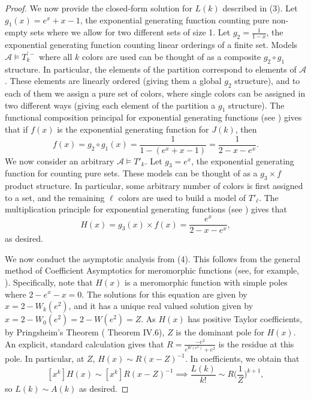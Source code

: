 \documentclass[11pt]{amsart}
\theoremstyle{definition}
\def\A{\mathcal A}
\begin{document}
\begin{proof}
    We now provide the closed-form solution for $L(k)$ described in (3).
    Let $g_1(x)=e^{x}+x-1$, the exponential generating function counting pure non-empty sets where we allow for two different sets of size 1.
    Let $g_2=\frac1{1-x}$, the exponential generating function counting linear orderings of a finite set.
    Models $\A\models T^{'-}_k$ where all $k$ colors are used can be thought of as a composite $g_2\circ g_1$ structure.
    In particular, the elements of the partition correspond to elements of $\A$.
    These elements are linearly ordered (giving them a global $g_2$ structure), and to each of them we assign a pure set of colors, where single colors can be assigned in two different ways (giving each element of the partition a $g_1$ structure).
    The functional composition principal for exponential generating functions (see \cite[Chapter 2]{AnCom}) gives that if $f(x)$ is the exponential generating function for $J(k)$, then
    \[f(x)= g_2\circ g_1(x)=\frac{1}{1-(e^{x}+x-1)}=\frac{1}{2-x-e^x}. \]
    We now consider an arbitrary $\A\models T'_k$.
    Let $g_3=e^x$, the exponential generating function for counting pure sets.
    These models can be thought of as a $g_3\times f$ product structure.
    In particular, some arbitrary number of colors is first assigned to a set, and the remaining $\ell$ colors are used to build a model of $T'_\ell$.
    The multiplication principle for exponential generating functions (see \cite[Chapter 2]{AnCom}) gives that
    \[H(x)=g_3(x)\times f(x)=\frac{e^x}{2-x-e^x},\]
    as desired.

    We now conduct the asymptotic analysis from (4).
    This follows from the general method of Coefficient Asymptotics for meromorphic functions (see, for example, \cite[Chapter VI.5.2]{AnCom}).
    Specifically, note that $H(x)$ is a meromorphic function with simple poles where $2-e^x-x=0$.
    The solutions for this equation are given by $x=2-W_k(e^2)$, and it has a unique real valued solution given by $x=2-W_0(e^2)= 2-W(e^2)=Z$.
    As $H(x)$ has positive Taylor coefficients, by Pringsheim’s Theorem (\cite{AnCom} Theorem IV.6), $Z$ is the dominant pole for $H(x)$.
    An explicit, standard calculation gives that $R=\frac{-e^2}{e^{W(e^2)}+e^2}$ is the residue at this pole.
    In particular, at $Z$, $H(x)\sim R(x-Z)^{-1}$.
    In coefficients, we obtain that
    \[[x^k]H(x)\sim[x^k]R(x-Z)^{-1} \implies \frac{L(k)}{k!}\sim R\Big(\frac1{Z}\Big)^{k+1},\]
    so $L(k)\sim A(k)$ as desired.


\end{proof}
\end{document}
